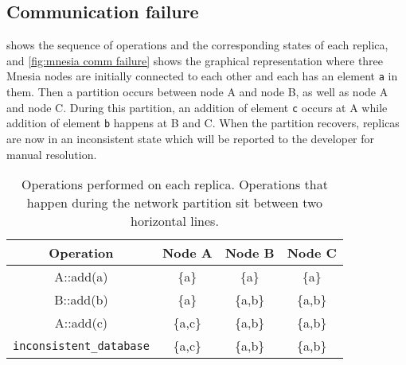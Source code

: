 \subsection{Communication failure} \label{subsec:impl communication failure}

 shows the sequence of
operations and the corresponding states of each replica, and
\cref{fig:mnesia comm failure} shows the graphical representation where three
Mnesia nodes are initially connected to each other and each has an element
\texttt{a} in them. Then a partition occurs between node A and node B, as well as
node A and node C. During this partition, an addition of 
element \texttt{c} occurs at A while addition of element \texttt{b} happens
at B and C. When the partition recovers, replicas are now in an inconsistent
state which will be reported to the developer for manual resolution.


\begin{table}[htp]
  \begin{tabular}{cccc}
    \toprule
    Operation & Node A & Node B & Node C \\
    \midrule
    A::add(a) & \{a\} & \{a\} & \{a\} \\
    \cmidrule{2-4}
    B::add(b) & \{a\} & \{a,b\} & \{a,b\} \\
    A::add(c) & \{a,c\} & \{a,b\} & \{a,b\} \\
    \cmidrule{2-4}
    \texttt{inconsistent\_database} & \{a,c\} & \{a,b\} & \{a,b\} \\
    \bottomrule
  \end{tabular} 
  \caption{Operations performed on each replica. Operations that happen during
  the network partition sit between two horizontal lines.}
  \label{tab:mnesia comm failure ops}
\end{table}

  
